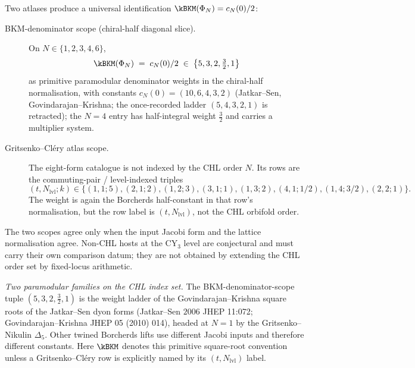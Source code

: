 \begin{theorem}
\label{thm:k3e-cy3-platonic-universal-kBKM}
Two atlases produce a universal identification $\kBKM(\Phi_N) = c_N(0)/2$:
\begin{description}
\item[BKM-denominator scope (chiral-half diagonal slice).] On $N \in \{1, 2, 3, 4, 6\}$,
\[
 \kBKM(\Phi_N) \;=\; c_N(0)/2 \;\in\; \bigl\{5, 3, 2, \tfrac32, 1\bigr\}
\]
as primitive paramodular denominator weights in the chiral-half normalisation, with constants $c_N(0) = (10, 6, 4, 3, 2)$ (Jatkar--Sen, Govindarajan--Krishna; the once-recorded ladder $(5, 4, 3, 2, 1)$ is retracted); the $N = 4$ entry has half-integral weight $\tfrac32$ and carries a multiplier system.
\item[Gritsenko--Cl\'ery atlas scope.] The eight-form catalogue is not
indexed by the CHL order $N$.  Its rows are the commuting-pair /
level-indexed triples
\[
 (t,N_{\mathrm{lvl}};k)\in
\{(1,1;5),(2,1;2),(1,2;3),(3,1;1),
(1,3;2),(4,1;1/2),(1,4;3/2),(2,2;1)\}.
\]
The weight is again the Borcherds half-constant in that row's
normalisation, but the row label is $(t,N_{\mathrm{lvl}})$, not the
CHL orbifold order.
\end{description}
The two scopes agree only when the input Jacobi form and the lattice
normalisation agree.  Non-CHL hosts at the CY$_3$ level are
conjectural and must carry their own comparison datum; they are not
obtained by extending the CHL order set by fixed-locus arithmetic.

\smallskip

\emph{Two paramodular families on the CHL index set.} The
BKM-denominator-scope tuple $(5, 3, 2, \tfrac32, 1)$ is the weight
ladder of the Govindarajan--Krishna square roots of the Jatkar--Sen
dyon forms (Jatkar--Sen $2006$ JHEP 11:072; Govindarajan--Krishna
JHEP 05 (2010) 014), headed at $N = 1$ by the Gritsenko--Nikulin
$\Delta_5$.
Other twined Borcherds lifts use different Jacobi inputs and therefore
different constants.  Here $\kBKM$ denotes this primitive
square-root convention unless a Gritsenko--Cl\'ery row is explicitly
named by its $(t,N_{\mathrm{lvl}})$ label.
\end{theorem}

